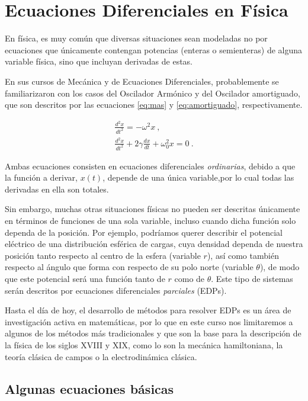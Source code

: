 \chapter{Ecuaciones Diferenciales en Física}

En física, es muy común que diversas situaciones sean modeladas no por ecuaciones que únicamente contengan potencias (enteras o semienteras) de alguna variable física, sino que incluyan derivadas de estas.

En sus cursos de Mecánica y de Ecuaciones Diferenciales, probablemente se familiarizaron con los casos del Oscilador Armónico y del Oscilador amortiguado, que son descritos por las ecuaciones \eqref{eq:mas} y \eqref{eq:amortiguado}, respectivamente.

\begin{gather}
    \frac{d^2x}{dt^2} = - \omega^2 x \ , \label{eq:mas} \\
    \frac{d^2x}{dt^2} + 2\gamma \frac{dx}{dt} + \omega^2_0 x = 0 \ . \label{eq:amortiguado}
\end{gather}

Ambas ecuaciones consisten en ecuaciones diferenciales \emph{ordinarias}, debido a que la función a derivar, $x(t)$, depende de una única variable,por lo cual todas las derivadas en ella son totales.

Sin embargo, muchas otras situaciones físicas no pueden ser descritas únicamente en términos de funciones de una sola variable, incluso cuando dicha función solo dependa de la posición. Por ejemplo, podríamos querer describir el potencial eléctrico de una distribución esférica de cargas, cuya densidad dependa de nuestra posición tanto respecto al centro de la esfera (variable $r$), así como también respecto al ángulo que forma con respecto de su polo norte (variable $\theta$), de modo que este potencial será una función tanto de $r$ como de $\theta$. Este tipo de sistemas serán descritos por ecuaciones diferenciales \emph{parciales} (EDPs).

Hasta el día de hoy, el desarrollo de métodos para resolver EDPs es un área de investigación activa en matemáticas, por lo que en este curso nos limitaremos a algunos de los métodos más tradicionales y que son la base para la descripción de la física de los siglos XVIII y XIX, como lo son la mecánica hamiltoniana, la teoría clásica de campos o la electrodinámica clásica.

\section{Algunas ecuaciones básicas}

